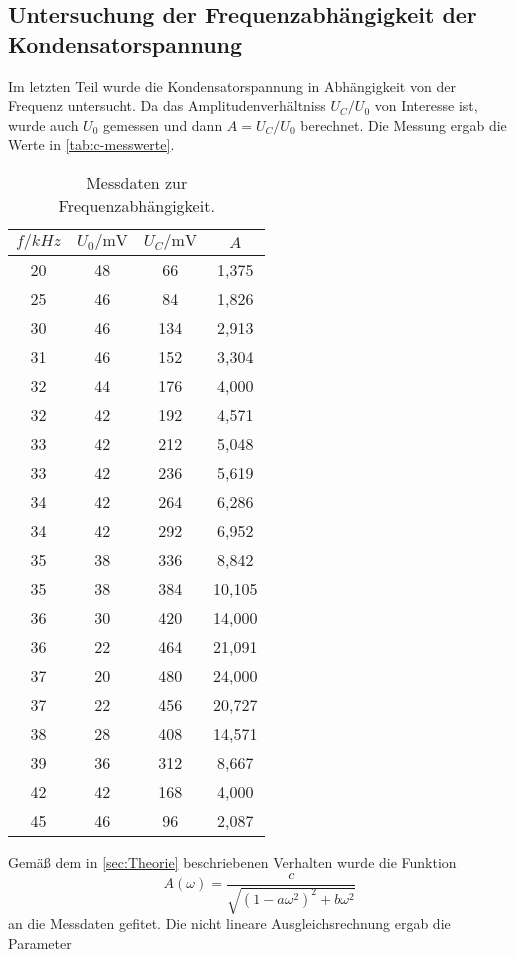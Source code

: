 \subsection{Untersuchung der Frequenzabhängigkeit der Kondensatorspannung}
\label{sec:Untersuchung der Frequenzabhängigkeit der Kondensatorspannung}
Im letzten Teil wurde die Kondensatorspannung in Abhängigkeit von der Frequenz untersucht.
Da das Amplitudenverhältniss $U_C / U_0$ von Interesse ist, wurde auch $U_0$ gemessen und
dann $A = U_C / U_0$ berechnet. Die Messung ergab die Werte in \autoref{tab:c-messwerte}.
\begin{table}
	\centering
	\caption{Messdaten zur Frequenzabhängigkeit.}
	\label{tab:c-messwerte}
	\begin{tabular}{c c c c}
		\toprule
		$f / \si{kHz}$	& $U_0 / \si{\milli\volt}$ & $U_C / \si{\milli\volt}$ &$A$ \\
		\midrule
		20	&48	&66&1,375	\\
		25	&46	&84&1,826	\\
		30	&46	&134&2,913	\\
		31	&46	&152&3,304	\\
		32	&44	&176&4,000	\\
		32	&42	&192&4,571	\\
		33	&42	&212&5,048	\\
		33	&42	&236&5,619	\\
		34	&42	&264&6,286	\\
		34	&42	&292&6,952	\\
		35	&38	&336&8,842	\\
		35	&38	&384&10,105	\\
		36	&30	&420&14,000	\\
		36	&22	&464&21,091	\\
		37	&20	&480&24,000	\\
		37	&22	&456&20,727	\\
		38	&28	&408&14,571	\\
		39	&36	&312&8,667	\\
		42	&42	&168&4,000	\\
		45	&46	&96&2,087	\\
		\bottomrule
	\end{tabular}
\end{table}
Gemäß dem in \autoref{sec:Theorie} beschriebenen Verhalten wurde die Funktion
\begin{equation}
	A(\omega) = \frac{c}{\sqrt{(1 - a \omega^2)^2 + b\omega^2}}
\end{equation}
an die Messdaten gefitet. Die nicht lineare Ausgleichsrechnung ergab die Parameter
